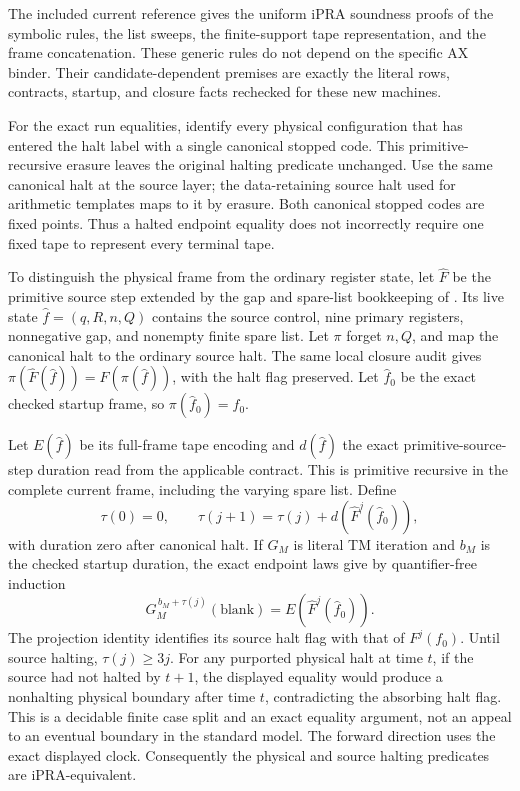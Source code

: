 \documentclass[11pt,a4paper]{article}
\newcommand{\ipra}{\mathrm{iPRA}}
\newcommand{\file}[1]{\texttt{\path{#1}}}
\begin{document}
The included current reference \file{physical_ipra_audit.tex}
gives the uniform $\ipra$ soundness proofs of the symbolic rules,
the list sweeps, the finite-support tape representation, and the
frame concatenation. These generic rules do not depend on the
specific AX binder. Their candidate-dependent premises are exactly
the literal rows, contracts, startup, and closure facts rechecked
for these new machines.

For the exact run equalities, identify every physical configuration that
has entered the halt label with a single canonical stopped code. This
primitive-recursive erasure leaves the original halting predicate unchanged.
Use the same canonical halt at the source layer; the data-retaining source
halt used for arithmetic templates maps to it by erasure. Both canonical
stopped codes are fixed points. Thus a halted endpoint equality does not
incorrectly require one fixed tape to represent every terminal tape.

To distinguish the physical frame from the ordinary register state, let
$\widehat F$ be the primitive source step extended by the gap and
spare-list bookkeeping of \file{physical_ipra_audit.tex}. Its live state
$\widehat f=(q,R,n,Q)$ contains the source control, nine primary registers,
nonnegative gap, and nonempty finite spare list. Let $\pi$ forget $n,Q$,
and map the canonical halt to the ordinary source halt. The same local
closure audit gives
$\pi(\widehat F(\widehat f))=F(\pi(\widehat f))$, with the halt flag
preserved. Let $\widehat f_0$ be the exact checked startup frame, so
$\pi(\widehat f_0)=f_0$.

Let $E(\widehat f)$ be its full-frame tape encoding and $d(\widehat f)$
the exact primitive-source-step duration read from the applicable
contract. This is primitive recursive in the complete current frame,
including the varying spare list. Define
\[
 \tau(0)=0,\qquad
 \tau(j+1)=\tau(j)+d(\widehat F^j(\widehat f_0)),
\]
with duration zero after canonical halt. If $G_M$ is literal TM
iteration and $b_M$ is the checked startup duration, the exact endpoint
laws give by quantifier-free induction
\[
 G_M^{\,b_M+\tau(j)}(\mathrm{blank})=E(\widehat F^j(\widehat f_0)).
\]
The projection identity identifies its source halt flag with that of
$F^j(f_0)$.
Until source halting, $\tau(j)\ge3j$.
For any purported physical halt at time $t$, if the source had not
halted by $t+1$, the displayed equality would produce a nonhalting
physical boundary after time $t$, contradicting the absorbing halt
flag. This is a decidable finite case split and an exact equality
argument, not an appeal to an eventual boundary in the standard
model. The forward direction uses the exact displayed clock.
Consequently the physical and source halting predicates are
$\ipra$-equivalent.
\end{document}
